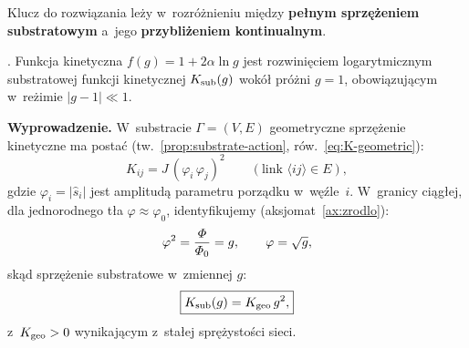 Klucz do rozwiązania leży w~rozróżnieniu między
\textbf{pełnym sprzężeniem substratowym} a~jego
\textbf{przybliżeniem kontinualnym}.

\begin{proposition}%
\label{prop:f-from-substrate}
.
Funkcja kinetyczna $f(g) = 1 + 2\alpha\ln g$ jest
rozwinięciem logarytmicznym substratowej funkcji
kinetycznej $K_{\rm sub}(g)$ wokół próżni $g = 1$,
obowiązującym w~reżimie $|g - 1| \ll 1$.

\medskip\noindent
\textbf{Wyprowadzenie.}
W~substracie $\Gamma = (V, E)$ geometryczne sprzężenie
kinetyczne ma postać (tw.~\ref{prop:substrate-action},
ró{}w.~\eqref{eq:K-geometric}):
\begin{equation}\label{eq:Kij-substrate}
  K_{ij} = J\,(\varphi_i\,\varphi_j)^2
  \qquad (\text{link } \langle ij \rangle \in E),
\end{equation}
gdzie $\varphi_i = |\hat{s}_i|$ jest amplitudą parametru porządku
w~węźle~$i$. W~granicy ciągłej, dla jednorodnego tła $\varphi \approx
\varphi_0$, identyfikujemy (aksjomat~\ref{ax:zrodlo}):
\begin{equation}\label{eq:phi-to-g}
  \varphi^2 = \frac{\varPhi}{\varPhi_0} = g,
  \qquad \varphi = \sqrt{g},
\end{equation}
skąd sprzężenie substratowe w~zmiennej $g$:
\begin{equation}\label{eq:Ksub-g}
  \boxed{
    K_{\rm sub}(g) = K_{\rm geo}\,g^2,
  }
\end{equation}
z~$K_{\rm geo} > 0$ wynikającym z~stałej sprężystości sieci.
\end{proposition}

